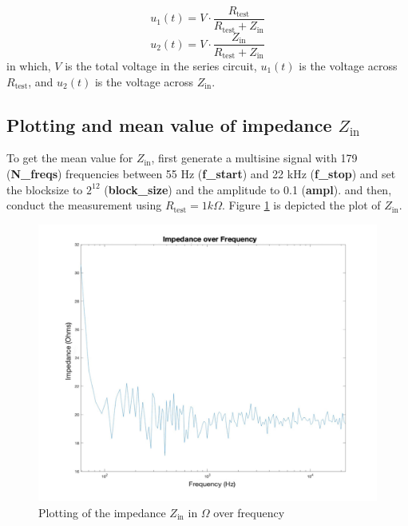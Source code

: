 \documentclass[
	a4paper,
	11pt,
]{article}
\begin{document}
\begin{equation}
    u_1(t) = V \cdot \frac{R_\text{test}}{R_\text{test} + Z_\text{in}}
\end{equation}
\begin{equation}
    u_2(t) = V \cdot \frac{Z_\text{in}}{R_\text{test} + Z_\text{in}}
\end{equation}
in which, \(V\) is the total voltage in the series circuit, \(u_1(t)\) is the voltage across \(R_\text{test}\), and \(u_2(t)\) is the voltage across \(Z_\text{in}\). 


\subsection{Plotting and mean value of impedance \(Z_{\text{in}}\)}

To get the mean value for \(Z_\text{in}\), first generate a multisine signal with 179 (\textbf{N\_freqs}) frequencies between 55 Hz (\textbf{f\_start}) and 22 kHz (\textbf{f\_stop}) and set the blocksize to \(2^12\) (\textbf{block\_size}) and the amplitude to 0.1 (\textbf{ampl}). and then, conduct the measurement using \(R_\text{test} = 1 k \Omega \). Figure \ref{fig:A3_Zin_plot} is depicted the plot of \(Z_\text{in}\). 

\begin{figure}[htb!]
    \centerline{\includegraphics[width=14cm]{figure/A3/Zinplot.jpeg}}
    \caption{Plotting of the impedance \(Z_\text{in}\) in \(\Omega\) over frequency}
    \label{fig:A3_Zin_plot}
\end{figure}
\end{document}
